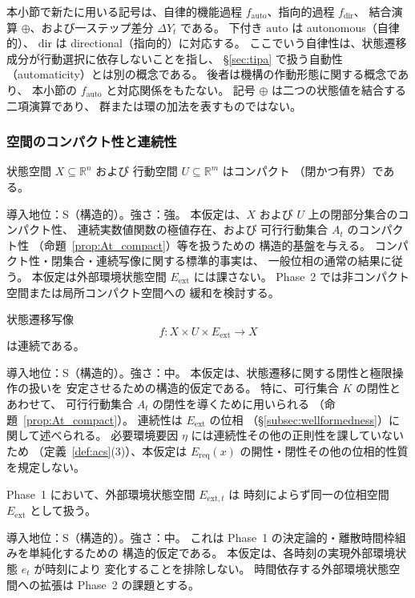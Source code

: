 本小節で新たに用いる記号は、自律的機能過程
$f_{\mathrm{auto}}$、指向的過程 $f_{\mathrm{dir}}$、
結合演算 $\oplus$、および一ステップ差分 $\Delta Y_t$ である。
下付き $\mathrm{auto}$ は autonomous（自律的）、
$\mathrm{dir}$ は directional（指向的）に対応する。
ここでいう自律性は、状態遷移成分が行動選択に依存しないことを指し、
\S\ref{sec:tipa} で扱う自動性（automaticity）とは別の概念である。
後者は機構の作動形態に関する概念であり、
本小節の $f_{\mathrm{auto}}$ と対応関係をもたない。
記号 $\oplus$ は二つの状態値を結合する二項演算であり、
群または環の加法を表すものではない。

\subsubsection{空間のコンパクト性と連続性}

\begin{assumption}[$X$・$U$ のコンパクト性]
\label{ass:compact_spaces}
状態空間 $X\subseteq\mathbb{R}^n$ および
行動空間 $U\subseteq\mathbb{R}^m$ はコンパクト
（閉かつ有界）である。

\medskip
\noindent
導入地位：S（構造的）。強さ：強。
本仮定は、$X$ および $U$ 上の閉部分集合のコンパクト性、
連続実数値関数の極値存在、および
可行行動集合 $A_t$ のコンパクト性
（命題~\ref{prop:At_compact}）等を扱うための
構造的基盤を与える。
コンパクト性・閉集合・連続写像に関する標準的事実は、
一般位相の通常の結果に従う\cite{Munkres2000}。
本仮定は外部環境状態空間 $E_{\mathrm{ext}}$ には課さない。
Phase~2 では非コンパクト空間または局所コンパクト空間への
緩和を検討する。
\end{assumption}

\begin{assumption}[$f$ の連続性]
\label{ass:f_continuity}
状態遷移写像
\[
  f:X\times U\times E_{\mathrm{ext}}\to X
\]
は連続である。

\medskip
\noindent
導入地位：S（構造的）。強さ：中。
本仮定は、状態遷移に関する閉性と極限操作の扱いを
安定させるための構造的仮定である。
特に、可行集合 $K$ の閉性とあわせて、
可行行動集合 $A_t$ の閉性を導くために用いられる
（命題~\ref{prop:At_compact}）。
連続性は $E_{\mathrm{ext}}$ の位相
（\S\ref{subsec:wellformedness}）に関して述べられる。
必要環境要因 $\eta$ には連続性その他の正則性を課していないため
（定義~\ref{def:acs}(3)）、本仮定は
$E_{\mathrm{req}}(x)$ の開性・閉性その他の位相的性質を規定しない。
\end{assumption}

\begin{assumption}
\label{ass:Eext_time_fixed}
Phase~1 において、外部環境状態空間 $E_{\mathrm{ext},t}$ は
時刻によらず同一の位相空間 $E_{\mathrm{ext}}$ として扱う。

\medskip
\noindent
導入地位：S（構造的）。強さ：中。
これは Phase~1 の決定論的・離散時間枠組みを単純化するための
構造的仮定である。
本仮定は、各時刻の実現外部環境状態 $e_t$ が時刻により
変化することを排除しない。
時間依存する外部環境状態空間への拡張は Phase~2 の課題とする。
\end{assumption}

